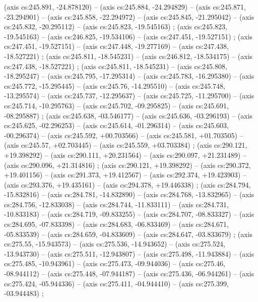     (axis cs:245.891,    -24.878120) --  (axis cs:245.884,    -24.294829) --  (axis cs:245.871,    -23.294901) --  (axis cs:245.858,    -22.294972) --  (axis cs:245.845,    -21.295042) --  (axis cs:245.832,    -20.295112) --  (axis cs:245.823,    -19.545163) ;
    (axis cs:245.823,    -19.545163) --  (axis cs:246.825,    -19.534106) --  (axis cs:247.451,    -19.527151) ;
    (axis cs:247.451,    -19.527151) --  (axis cs:247.448,    -19.277169) --  (axis cs:247.438,    -18.527221) ;
    (axis cs:245.811,    -18.545231) --  (axis cs:246.812,    -18.534175) --  (axis cs:247.438,    -18.527221) ;
    (axis cs:245.811,    -18.545231) --  (axis cs:245.808,    -18.295247) --  (axis cs:245.795,    -17.295314) --  (axis cs:245.783,    -16.295380) --  (axis cs:245.772,    -15.295445) --  (axis cs:245.76,    -14.295510) --  (axis cs:245.748,    -13.295574) --  (axis cs:245.737,    -12.295637) --  (axis cs:245.725,    -11.295700) --  (axis cs:245.714,    -10.295763) --  (axis cs:245.702,    -09.295825) --  (axis cs:245.691,    -08.295887) ;
    (axis cs:245.638,    -03.546177) --  (axis cs:245.636,    -03.296193) --  (axis cs:245.625,    -02.296253) --  (axis cs:245.614,    -01.296314) --  (axis cs:245.603,    -00.296374) --  (axis cs:245.592,    +00.703566) --  (axis cs:245.581,    +01.703505) --  (axis cs:245.57,    +02.703445) --  (axis cs:245.559,    +03.703384) ;
    (axis cs:290.121,    +19.398292) --  (axis cs:290.111,    +20.231564) --  (axis cs:290.097,    +21.231489) --  (axis cs:290.096,    +21.314816) ;
    (axis cs:290.121,    +19.398292) --  (axis cs:290.372,    +19.401156) --  (axis cs:291.373,    +19.412567) --  (axis cs:292.374,    +19.423903) --  (axis cs:293.376,    +19.435161) --  (axis cs:294.378,    +19.446338) ;
    (axis cs:284.794,    -15.832816) --  (axis cs:284.781,    -14.832890) --  (axis cs:284.768,    -13.832965) --  (axis cs:284.756,    -12.833038) --  (axis cs:284.744,    -11.833111) --  (axis cs:284.731,    -10.833183) --  (axis cs:284.719,    -09.833255) --  (axis cs:284.707,    -08.833327) --  (axis cs:284.695,    -07.833398) --  (axis cs:284.683,    -06.833469) --  (axis cs:284.671,    -05.833539) --  (axis cs:284.659,    -04.833609) --  (axis cs:284.647,    -03.833679) ;
    (axis cs:275.55,    -15.943573) --  (axis cs:275.536,    -14.943652) --  (axis cs:275.524,    -13.943730) --  (axis cs:275.511,    -12.943807) --  (axis cs:275.498,    -11.943884) --  (axis cs:275.485,    -10.943961) --  (axis cs:275.473,    -09.944036) --  (axis cs:275.46,    -08.944112) --  (axis cs:275.448,    -07.944187) --  (axis cs:275.436,    -06.944261) --  (axis cs:275.424,    -05.944336) --  (axis cs:275.411,    -04.944410) --  (axis cs:275.399,    -03.944483) ;

